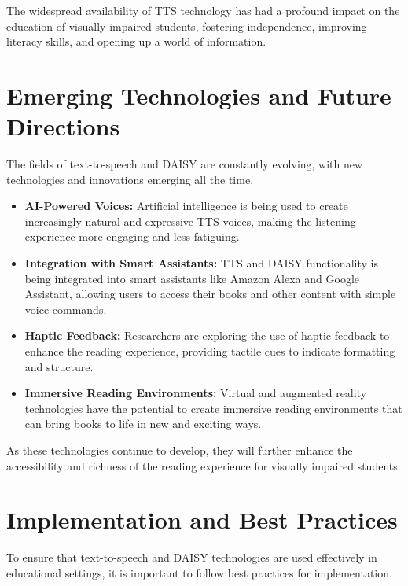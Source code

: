 The widespread availability of TTS technology has had a profound impact on the education of visually impaired students, fostering independence, improving literacy skills, and opening up a world of information.\supercite{Kelly2011, Holbrook2006}

\section{Emerging Technologies and Future Directions}

The fields of text-to-speech and DAISY are constantly evolving, with new technologies and innovations emerging all the time.\supercite{aimodels2024}

\begin{itemize}
	\item \textbf{AI-Powered Voices:} Artificial intelligence is being used to create increasingly natural and expressive TTS voices, making the listening experience more engaging and less fatiguing.
	\item \textbf{Integration with Smart Assistants:} TTS and DAISY functionality is being integrated into smart assistants like Amazon Alexa and Google Assistant, allowing users to access their books and other content with simple voice commands.
	\item \textbf{Haptic Feedback:} Researchers are exploring the use of haptic feedback to enhance the reading experience, providing tactile cues to indicate formatting and structure.
	\item \textbf{Immersive Reading Environments:} Virtual and augmented reality technologies have the potential to create immersive reading environments that can bring books to life in new and exciting ways.
\end{itemize}

As these technologies continue to develop, they will further enhance the accessibility and richness of the reading experience for visually impaired students.

\section{Implementation and Best Practices}

To ensure that text-to-speech and DAISY technologies are used effectively in educational settings, it is important to follow best practices for implementation.\supercite{Burgstahler2015}

